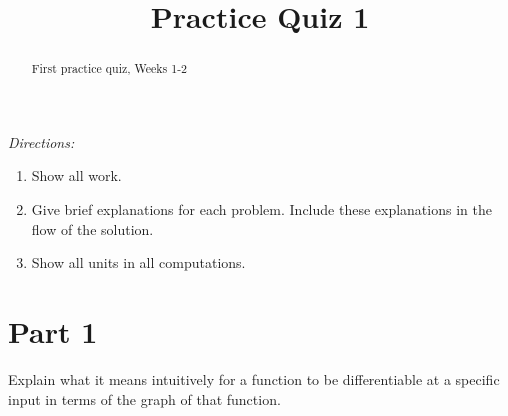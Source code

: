 \documentclass{ximera}
\title{Practice Quiz 1}
\begin{document}
\begin{abstract}
First practice quiz, Weeks 1-2
\end{abstract}
\maketitle

\emph{Directions:}

\begin{enumerate}
\item Show all work.

\item Give brief explanations for each problem. Include these explanations in the flow of the solution.

\item Show all units in all computations.
\end{enumerate}


\section{Part 1}

\begin{question}  \label{Q4t5tgwertftggf}
Explain what it means intuitively for a function to be differentiable at a specific input in terms of the graph of that function.
\end{question}
\end{document}
